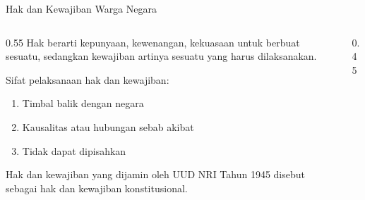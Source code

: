 \documentclass[11pt, aspectratio=169]{beamer}
\begin{document}
\begin{frame}{Hak dan Kewajiban Warga Negara}
    \begin{columns}[c]
        \begin{column}{0.55\textwidth}
            \small
            Hak berarti kepunyaan, kewenangan, kekuasaan untuk berbuat sesuatu, sedangkan kewajiban artinya sesuatu yang harus dilaksanakan.
            
            \vspace{3mm}
            Sifat pelaksanaan hak dan kewajiban:
            \begin{enumerate}
                \item Timbal balik dengan negara
                \item Kausalitas atau hubungan sebab akibat
                \item Tidak dapat dipisahkan
            \end{enumerate}

            \vspace{3mm}
            Hak dan kewajiban yang dijamin oleh UUD NRI Tahun 1945 disebut sebagai hak dan kewajiban konstitusional.
        \end{column}
        \begin{column}{0.45\textwidth}
            \centering
        \end{column}
    \end{columns}
\end{frame}
\end{document}
